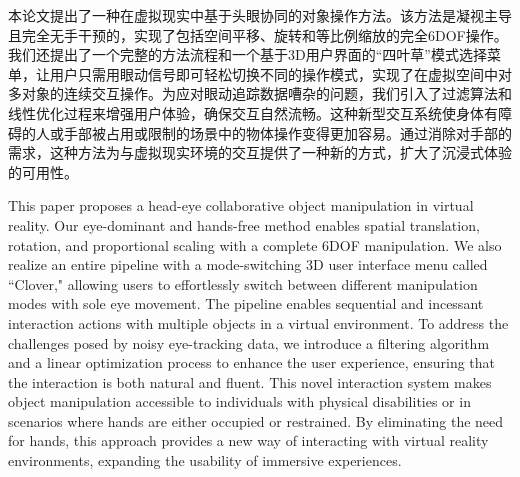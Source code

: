 
\begin{cabstract}
本论文提出了一种在虚拟现实中基于头眼协同的对象操作方法。该方法是凝视主导且完全无手干预的，实现了包括空间平移、旋转和等比例缩放的完全6DOF操作。我们还提出了一个完整的方法流程和一个基于3D用户界面的“四叶草”模式选择菜单，让用户只需用眼动信号即可轻松切换不同的操作模式，实现了在虚拟空间中对多对象的连续交互操作。为应对眼动追踪数据嘈杂的问题，我们引入了过滤算法和线性优化过程来增强用户体验，确保交互自然流畅。这种新型交互系统使身体有障碍的人或手部被占用或限制的场景中的物体操作变得更加容易。通过消除对手部的需求，这种方法为与虚拟现实环境的交互提供了一种新的方式，扩大了沉浸式体验的可用性。
\end{cabstract}

\begin{eabstract}
This paper proposes a head-eye collaborative object manipulation in virtual reality. Our eye-dominant and hands-free method enables spatial translation, rotation, and proportional scaling with a complete 6DOF manipulation. We also realize an entire pipeline with a mode-switching 3D user interface menu called ``Clover," allowing users to effortlessly switch between different manipulation modes with sole eye movement. The pipeline enables sequential and incessant interaction actions with multiple objects in a virtual environment. To address the challenges posed by noisy eye-tracking data, we introduce a filtering algorithm and a linear optimization process to enhance the user experience, ensuring that the interaction is both natural and fluent. This novel interaction system makes object manipulation accessible to individuals with physical disabilities or in scenarios where hands are either occupied or restrained. By eliminating the need for hands, this approach provides a new way of interacting with virtual reality environments, expanding the usability of immersive experiences.
\end{eabstract}